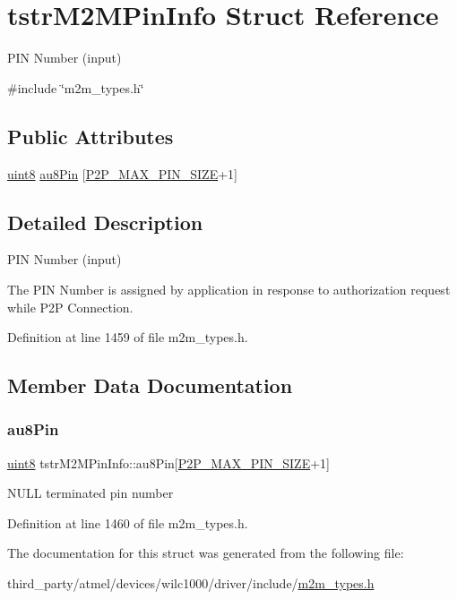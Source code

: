 \hypertarget{structtstrM2MPinInfo}{}\section{tstr\+M2\+M\+Pin\+Info Struct Reference}
\label{structtstrM2MPinInfo}


P\+IN Number (input)  




{\ttfamily \#include \char`\"{}m2m\+\_\+types.\+h\char`\"{}}

\subsection*{Public Attributes}
\begin{DoxyCompactItemize}
\item 
\hyperlink{group__DataT_ga4df709a77647e870bbf1d955b8edc9a6}{uint8} \hyperlink{structtstrM2MPinInfo_a9d3b5b090a60a457e4fdba975a154912}{au8\+Pin} \mbox{[}\hyperlink{group__WlanDefines_ga4fa7157264d4384874b272c57a6083f6}{P2\+P\+\_\+\+M\+A\+X\+\_\+\+P\+I\+N\+\_\+\+S\+I\+ZE}+1\mbox{]}
\end{DoxyCompactItemize}


\subsection{Detailed Description}
P\+IN Number (input) 

The P\+IN Number is assigned by application in response to authorization request while P2P Connection. 

Definition at line 1459 of file m2m\+\_\+types.\+h.



\subsection{Member Data Documentation}
\mbox{\label{structtstrM2MPinInfo_a9d3b5b090a60a457e4fdba975a154912}} 
\subsubsection{\texorpdfstring{au8\+Pin}{au8Pin}}
{\footnotesize\ttfamily \hyperlink{group__DataT_ga4df709a77647e870bbf1d955b8edc9a6}{uint8} tstr\+M2\+M\+Pin\+Info\+::au8\+Pin\mbox{[}\hyperlink{group__WlanDefines_ga4fa7157264d4384874b272c57a6083f6}{P2\+P\+\_\+\+M\+A\+X\+\_\+\+P\+I\+N\+\_\+\+S\+I\+ZE}+1\mbox{]}}

N\+U\+LL terminated pin number 

Definition at line 1460 of file m2m\+\_\+types.\+h.



The documentation for this struct was generated from the following file\+:\begin{DoxyCompactItemize}
\item 
third\+\_\+party/atmel/devices/wilc1000/driver/include/\hyperlink{m2m__types_8h}{m2m\+\_\+types.\+h}\end{DoxyCompactItemize}
